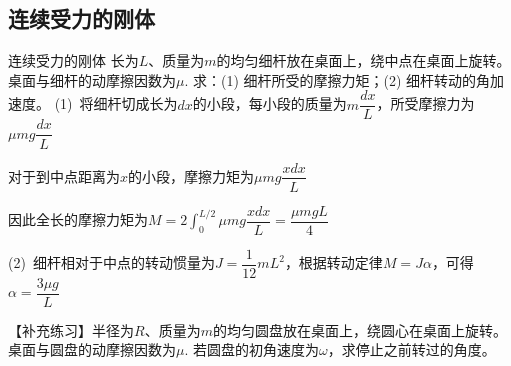 \subsection{连续受力的刚体}

\begin{example}{连续受力的刚体}
    长为$L$、质量为$m$的均匀细杆放在桌面上，绕中点在桌面上旋转。桌面与细杆的动摩擦因数为$\mu$. 求：(1) 细杆所受的摩擦力矩；(2) 细杆转动的角加速度。
    \tcblower
    (1)~将细杆切成长为$dx$的小段，每小段的质量为$m\dfrac{dx}{L}$，所受摩擦力为$\mu mg\dfrac{dx}{L}$
    
    对于到中点距离为$x$的小段，摩擦力矩为$\mu mg\dfrac{xdx}{L}$

    因此全长的摩擦力矩为$M=2\displaystyle\int_0^{L/2}{\mu mg\dfrac{xdx}{L}}=\dfrac{\mu mgL}{4}$

    (2)~细杆相对于中点的转动惯量为$J=\dfrac{1}{12}mL^2$，根据转动定律$M=J\alpha$，可得$\alpha=\dfrac{3\mu g}{L}$

    \tcbline

    【补充练习】半径为$R$、质量为$m$的均匀圆盘放在桌面上，绕圆心在桌面上旋转。桌面与圆盘的动摩擦因数为$\mu$. 若圆盘的初角速度为$\omega$，求停止之前转过的角度。
\end{example}